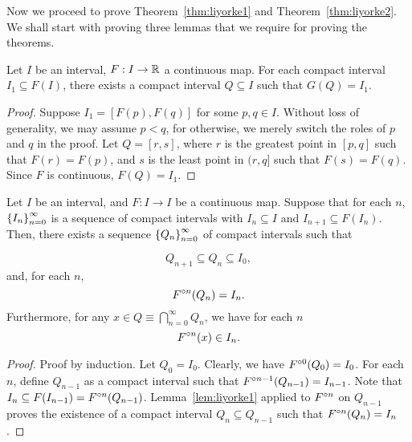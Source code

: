 \documentclass[12pt,draft,twoside]{book}
\begin{document}
Now we proceed to prove Theorem~\ref{thm:liyorke1} and Theorem~\ref{thm:liyorke2}.
We shall start with proving three lemmas that we require for proving the theorems.

\begin{lemma}
  Let $I$ be an interval, $F: I \to \mathbb{R}$ a continuous map.
  For each compact interval $I_1 \subseteq F(I)$, there exists a compact interval $Q \subseteq I$ such that $G(Q) = I_1$.
  \label{lem:liyorke1}
  \begin{proof}
    Suppose $I_1 = [F(p),F(q)]$ for some $p,q \in I$.
    Without loss of generality, we may assume $p < q$, for otherwise, we merely switch the roles of $p$ and $q$ in the proof.
    Let $Q = [r,s]$, where $r$ is the greatest point in $[p,q]$ such that $F(r) = F(p)$, and $s$ is the least point in $(r,q]$ such that $F(s) = F(q)$.
    Since $F$ is continuous, $F(Q) = I_1$.
  \end{proof}
\end{lemma}

\begin{lemma}
  Let $I$ be an interval, and $F: I\to I$ be a continuous map.
  Suppose that for each $n$, $\left \{ I_n \right \}^{\infty}_{n=0}$ is a sequence of compact intervals with $I_n \subseteq I$ and $I_{n+1} \subseteq F(I_n)$.
  Then, there exists a sequence $\left \{ Q_n \right \}^{\infty}_{n=0}$ of compact intervals such that 
  

\begin{equation*}
    Q_{n+1} \subseteq Q_{n} \subseteq I_0,
  \end{equation*}
and, for each $n$,
  \begin{equation*}
    F^{\circ n}(Q_n) = I_n.
  \end{equation*}
  Furthermore, for any $x \in Q \equiv \bigcap\limits_{n=0}^{\infty}Q_n$, we have for each $n$
  \begin{equation*}
    F^{\circ n}(x) \in I_n.
  \end{equation*}
  \label{lem:liyorke2}
  \begin{proof}
    Proof by induction.
    Let $Q_0 = I_0$.
    Clearly, we have $F^{\circ 0}(Q_0) = I_0$.
    For each $n$, define $Q_{n-1}$ as a compact interval such that $F^{\circ n-1}(Q_{n-1}) = I_{n-1}$.
    Note that $I_n \subseteq F(I_{n-1}) = F^{\circ n}(Q_{n-1})$.
    Lemma~\ref{lem:liyorke1} applied to $F^{\circ n}$ on $Q_{n-1}$ proves the existence of a compact interval $Q_n \subseteq Q_{n-1}$ such that $F^{\circ n}(Q_n) = I_n$.
  \end{proof}
\end{lemma}
\end{document}
